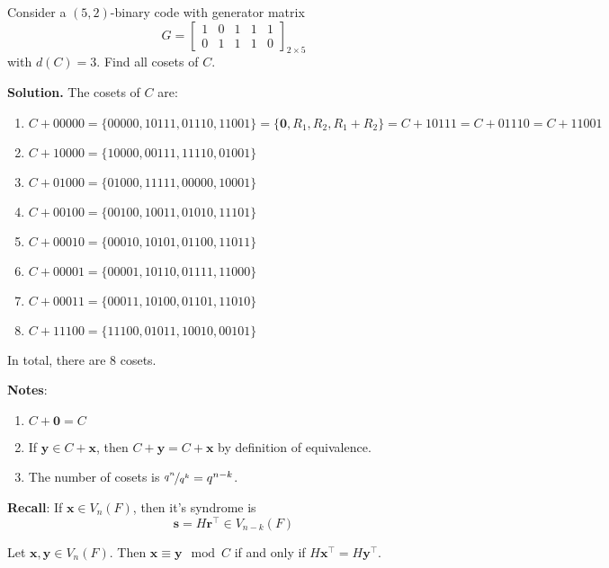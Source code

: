 \begin{exbox}
    \begin{example}[Cosets]
        Consider a $ (5,2) $-binary code with generator matrix
        \[ G=\begin{bmatrix}
                1 & 0 & 1 & 1 & 1 \\
                0 & 1 & 1 & 1 & 0
            \end{bmatrix}_{2\times 5} \]
        with $ d(C)=3 $. Find all cosets of $ C $.

        \textbf{Solution.} The cosets of $ C $ are:
        \begin{enumerate}[(1)]
            \item $ C+00000=\{00000,10111,01110,11001\}=\{\bm{0},R_1,R_2, R_1+R_2\}
                      = C+10111 = C+01110 = C + 11001 $
            \item $ C+10000=\{10000,00111,11110,01001\} $
            \item $ C+01000=\{01000,11111,00000,10001\} $
            \item $ C+00100=\{00100,10011,01010,11101\} $
            \item $ C+00010=\{00010,10101,01100,11011\} $
            \item $ C+00001=\{00001,10110,01111,11000\} $
            \item $ C+00011=\{00011,10100,01101,11010\} $
            \item $ C+11100=\{11100,01011,10010,00101\} $
        \end{enumerate}
        In total, there are $ 8 $ cosets.
    \end{example}
\end{exbox}

\textbf{Notes}:
\begin{enumerate}[(1)]
    \item $ C+\bm{0}=C $
    \item If $ \bm{y}\in C+\bm{x} $, then $ C+\bm{y}=C+\bm{x} $ by definition
          of equivalence.
    \item The number of cosets is $ \nicefrac{q^n}{q^k}=q^{n-k} $.
\end{enumerate}

\textbf{Recall}: If $ \bm{x}\in V_n(F) $, then it's syndrome is
\[ \bm{s}=H\bm{r}^\top\in V_{n-k}(F) \]

\begin{thmbox}
    \begin{theorem}
        Let $ \bm{x},\bm{y}\in V_n(F) $. Then $ \bm{x}\equiv \bm{y}\mod C $
        if and only if $ H\bm{x}^\top=H\bm{y}^\top $.
    \end{theorem}
\end{thmbox}

